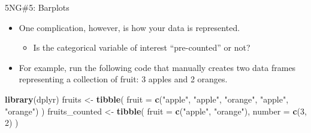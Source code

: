 \documentclass[
  ignorenonframetext,
]{beamer}
\newenvironment{Shaded}{\begin{snugshade}}{\end{snugshade}}
\newcommand{\AttributeTok}[1]{\textcolor[rgb]{0.13,0.29,0.53}{#1}}
\newcommand{\DecValTok}[1]{\textcolor[rgb]{0.00,0.00,0.81}{#1}}
\newcommand{\FunctionTok}[1]{\textcolor[rgb]{0.13,0.29,0.53}{\textbf{#1}}}
\newcommand{\NormalTok}[1]{#1}
\newcommand{\OtherTok}[1]{\textcolor[rgb]{0.56,0.35,0.01}{#1}}
\newcommand{\StringTok}[1]{\textcolor[rgb]{0.31,0.60,0.02}{#1}}
\providecommand{\tightlist}{%
  \setlength{\itemsep}{0pt}\setlength{\parskip}{0pt}}
\begin{document}
\begin{frame}[fragile]{5NG\#5: Barplots}
\protect\hypertarget{ng5-barplots-1}{}
\begin{itemize}
\item
  One complication, however, is how your data is represented.

  \begin{itemize}
  \tightlist
  \item
    Is the categorical variable of interest ``pre-counted'' or not?
  \end{itemize}
\item
  For example, run the following code that manually creates two data
  frames representing a collection of fruit: 3 apples and 2 oranges.
\end{itemize}

\tiny

\begin{Shaded}
\begin{Highlighting}[]
\FunctionTok{library}\NormalTok{(dplyr)}
\NormalTok{fruits }\OtherTok{\textless{}{-}} \FunctionTok{tibble}\NormalTok{(}
  \AttributeTok{fruit =} \FunctionTok{c}\NormalTok{(}\StringTok{"apple"}\NormalTok{, }\StringTok{"apple"}\NormalTok{, }\StringTok{"orange"}\NormalTok{, }\StringTok{"apple"}\NormalTok{, }\StringTok{"orange"}\NormalTok{)}
\NormalTok{)}
\NormalTok{fruits\_counted }\OtherTok{\textless{}{-}} \FunctionTok{tibble}\NormalTok{(}
  \AttributeTok{fruit =} \FunctionTok{c}\NormalTok{(}\StringTok{"apple"}\NormalTok{, }\StringTok{"orange"}\NormalTok{),}
  \AttributeTok{number =} \FunctionTok{c}\NormalTok{(}\DecValTok{3}\NormalTok{, }\DecValTok{2}\NormalTok{)}
\NormalTok{)}
\end{Highlighting}
\end{Shaded}

\normalsize
\end{frame}
\end{document}
